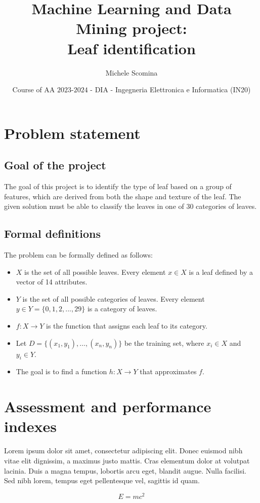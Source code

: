 \documentclass{article}
\title{Machine Learning and Data Mining project:\\Leaf identification}
\author[1]{Michele Scomina}
\affil[1]{
    problem statement,
    solution design,
    solution development,
    data gathering,
    writing
}
\date{Course of AA $2023$-$2024$ - DIA - Ingegneria Elettronica e Informatica (IN20)}
\begin{document}
\maketitle



\section{Problem statement}
\subsection{Goal of the project}
The goal of this project is to identify the type of leaf based on a group of features, which are derived from both the shape and texture of the leaf.
The given solution must be able to classify the leaves in one of 30 categories of leaves.

\subsection{Formal definitions}
The problem can be formally defined as follows:
\begin{itemize}
    \item $X$ is the set of all possible leaves. Every element $x \in X$ is a leaf defined by a vector of 14 attributes.
    \item $Y$ is the set of all possible categories of leaves. Every element $y \in Y = \{0, 1, 2, ..., 29\}$ is a category of leaves.
    \item $f: X \to Y$ is the function that assigns each leaf to its category.
    \item Let $D = \{(x_1, y_1), \ldots, (x_n, y_n)\}$ be the training set, where $x_i \in X$ and $y_i \in Y$.
    \item The goal is to find a function $h: X \to Y$ that approximates $f$.
\end{itemize}


\section{Assessment and performance indexes}
Lorem ipsum dolor sit amet, consectetur adipiscing elit.
Donec euismod nibh vitae elit dignissim, a maximus justo mattis.
Cras elementum dolor at volutpat lacinia.
Duis a magna tempus, lobortis arcu eget, blandit augue.
Nulla facilisi.
Sed nibh lorem, tempus eget pellentesque vel, sagittis id quam.

\begin{equation}
    E=mc^2
\end{equation}
\end{document}
